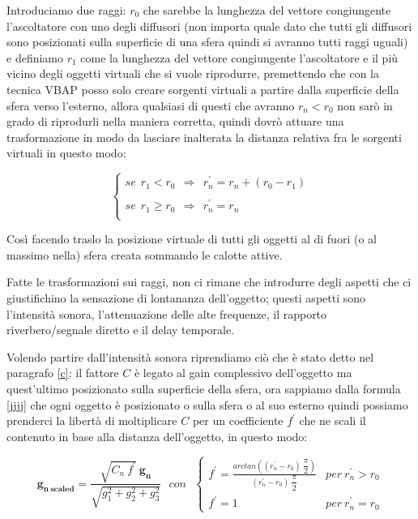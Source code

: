 \documentclass[12pt,a4paper]{report}
\begin{document}
Introduciamo due raggi: $r_0$ che sarebbe la lunghezza del vettore congiungente l'ascoltatore con uno degli diffusori (non importa quale dato che tutti gli diffusori sono posizionati sulla superficie di una sfera quindi si avranno tutti raggi uguali) e definiamo $r_1$ come la lunghezza del vettore congiungente l'ascoltatore e il più vicino degli oggetti virtuali che si vuole riprodurre, premettendo che con la tecnica VBAP posso solo creare sorgenti virtuali a partire dalla superficie della sfera verso l'esterno, allora qualsiasi di questi che avranno $r_n < r_0$ non sarò in grado di riprodurli nella maniera corretta, quindi dovrò attuare una trasformazione in modo da lasciare inalterata la distanza relativa fra le sorgenti virtuali in questo modo:

\begin{equation}
\left\{\begin{matrix}
se\ \  r_1 < r_0\ \ \Rightarrow \ \ r_n^{\prime} = r_n+(r_0 - r_1) \\
\\
se\ \  r_1 \geq r_0\ \ \Rightarrow \ \ r_n^{\prime} = r_n\\
\end{matrix}\right.
\label{jjjj}
\end{equation}

Così facendo traslo la posizione virtuale di tutti gli oggetti al di fuori (o al massimo nella) sfera creata sommando le calotte attive.

Fatte le trasformazioni sui raggi, non ci rimane che introdurre degli aspetti che ci giustifichino la sensazione di lontananza dell'oggetto; questi aspetti sono l'intensità sonora, l'attenuazione delle alte frequenze, il rapporto riverbero/segnale diretto e il delay temporale. 

Volendo partire dall'intensità sonora riprendiamo ciò che è stato detto nel paragrafo \ref{c}: il fattore $C$ è legato al gain complessivo dell'oggetto ma quest'ultimo posizionato sulla superficie della sfera, ora sappiamo dalla formula \ref{jjjj} che ogni oggetto è posizionato o sulla sfera o al suo esterno quindi possiamo prenderci la libertà di moltiplicare $C$ per un coefficiente $f^{\prime}$ che ne scali il contenuto in base alla distanza dell'oggetto, in questo modo:

\begin{equation}
\boldsymbol{g_{n\ scaled}} = \dfrac{\sqrt{C_n \ f^{\prime}}\ \boldsymbol{g_n}}{\sqrt{g_1^2 +g_2^2 + g_3^2}} \ \ \ con \ \ \ \left\{\begin{matrix}
f^{\prime}= \frac{arctan\left((r_n^{\prime}-r_0)\ \dfrac{\pi}{2}\right)}{(r_n^{\prime}-r_0)\ \dfrac{\pi}{2}} & per\ r_n^{\prime}>r_0
\\
f^{\prime}=1 & per\ r_n^{\prime}=r_0
\end{matrix}\right.
\label{kkkk}
\end{equation}
\end{document}
